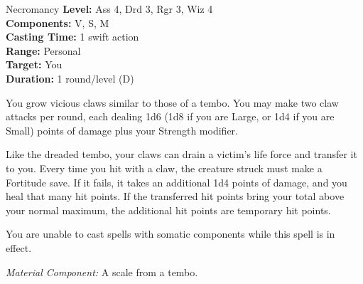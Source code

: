 {Necromancy}
{
	\textbf{Level:}
	Ass 4, Drd 3, Rgr 3, Wiz 4\\
	\textbf{Components:}
	V, S, M\\
	\textbf{Casting Time:}
	1 swift action\\
	\textbf{Range:}
	Personal\\
	\textbf{Target:}
	You\\
	\textbf{Duration:}
	1 round/level (D)\\
}
{
	You grow vicious claws similar to those of a tembo. You may make two claw attacks per round, each dealing 1d6 (1d8 if you are Large, or 1d4 if you are Small) points of damage plus your Strength modifier.

	Like the dreaded tembo, your claws can drain a victim's life force and transfer it to you. Every time you hit with a claw, the creature struck must make a Fortitude save. If it fails, it takes an additional 1d4 points of damage, and you heal that many hit points. If the transferred hit points bring your total above your normal maximum, the additional hit points are temporary hit points.

	You are unable to cast spells with somatic components while this spell is in effect.

	\textit{Material Component:} A scale from a tembo.
}
